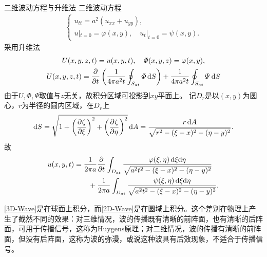\iffalse
\begin{align*}
	\varphi\begin{pmatrix}
		\xi \\\eta\\\zeta
	\end{pmatrix}=\varphi\begin{pmatrix}
		x+at\sin\theta\cos\phi \\
		y+at\sin\theta\sin\phi \\
		z+at\cos\theta
	\end{pmatrix}.
\end{align*}
\fi
\begin{example}{二维波动方程与升维法}{}
	二维波动方程
	\begin{align*}
		\begin{cases}
			u_{tt}=a^2(u_{xx}+u_{yy}), \\
			u|_{t=0}=\varphi(x,y),\quad u_t|_{t=0}=\psi(x,y).
		\end{cases}
	\end{align*}
	采用升维法
	\begin{gather*}
		U(x,y,z,t)=u(x,y,t),\quad\varPhi(x,y,z)=\varphi(x,y),\\
		U(x,y,z,t)=\frac{\partial^{{}}}{\partial{t}^{{}}}\left(\frac1{4\pi a^2t}\oint_{S_{at}}\varPhi\mathop{}\!\mathrm{d} S\right)+\frac1{4\pi a^2t}\oint_{S_{at}}\varPsi\mathop{}\!\mathrm{d} S
	\end{gather*}
	由于$U,\varPhi,\varPsi$取值与$z$无关，故积分区域可投影到$xy$平面上。
	记$D_r$是以$(x,y)$为圆心，$r$为半径的圆内区域，在$D_r$上
	\[
		\mathop{}\!\mathrm{d} S=\sqrt{1+\left(\frac{\partial^{{}}\zeta}{\partial{\xi}^{{}}}\right)^2+\left(\frac{\partial^{{}}\zeta}{\partial{\eta}^{{}}}\right)^2}\mathop{}\!\mathrm{d} A=\frac{r\mathop{}\!\mathrm{d} A}{\sqrt{r^2-(\xi-x)^2-(\eta-y)^2}}.
	\]
	故
	\begin{align}\label{2D-Wave}
		\begin{aligned}
			u(x,y,t)&= \frac1{2\pi a}\frac{\partial^{{}}}{\partial{t}^{{}}}\int_{D_{at}}\frac{\varphi(\xi,\eta)\mathop{}\!\mathrm{d}\xi\mathrm{d}\eta}{\sqrt{a^2t^2-(\xi-x)^2-(\eta-y)^2}} \\
			&\qquad +\frac1{2\pi a}\int_{D_{at}}\frac{\psi(\xi,\eta)\mathop{}\!\mathrm{d}\xi\mathrm{d}\eta}{\sqrt{a^2t^2-(\xi-x)^2-(\eta-y)^2}}.
		\end{aligned}
	\end{align}
\end{example}
\begin{remark}
	\eqref{3D-Wave}是在球面上积分，而\eqref{2D-Wave}是在圆域上积分。这个差别在物理上产生了截然不同的效果：对三维情况，波的传播既有清晰的前阵面，也有清晰的后阵面，可用于传播信号，这称为Huygens原理；对二维情况，波的传播有清晰的前阵面，但没有后阵面，这称为波的弥漫，或说这种波具有后效现象，不适合于传播信号。
\end{remark}
